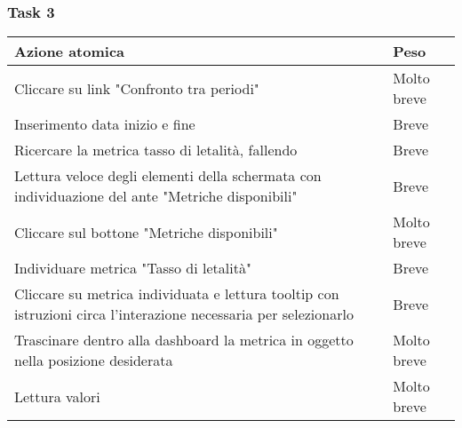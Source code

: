 \subsubsection{Task 3}
\label{sss:iaa-task-3}

{
\renewcommand{\arraystretch}{2}
\begin{longtable}[h]{| p{14cm} | p{2.5cm} |}
    \hline
    \textbf{Azione atomica} & \textbf{Peso} \\
    \hline
    \endhead
    Cliccare su link "Confronto tra periodi" & Molto breve \\
    \hline
    Inserimento data inizio e fine & Breve  \\
    \hline
    Ricercare la metrica tasso di letalità, fallendo & Breve \\
    \hline
    Lettura veloce degli elementi della schermata con individuazione del ante "Metriche disponibili" & Breve \\
    \hline
    Cliccare sul bottone "Metriche disponibili" & Molto breve \\
    \hline
    Individuare metrica "Tasso di letalità"  & Breve \\
    \hline
    Cliccare su metrica individuata e lettura tooltip con istruzioni circa l'interazione necessaria per selezionarlo & Breve \\
    \hline
    Trascinare dentro alla dashboard la metrica in oggetto nella posizione desiderata & Molto breve \\
    \hline
    Lettura valori & Molto breve \\
    \hline
\end{longtable}
}
